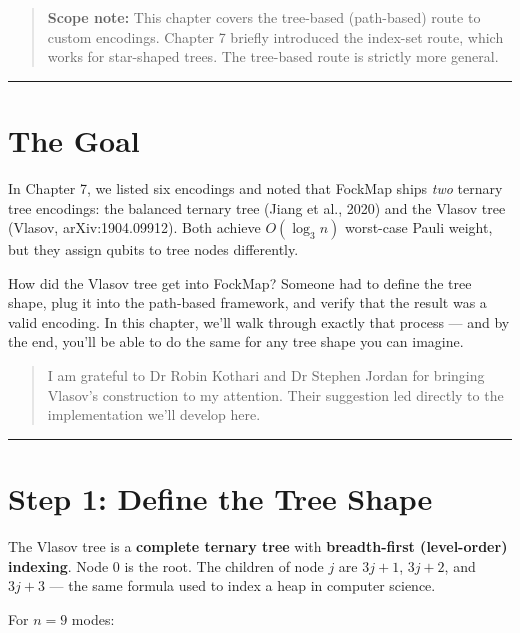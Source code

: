 \documentclass[
  11pt,
  oneside]{book}
\begin{document}
\begin{quote}
\textbf{Scope note:} This chapter covers the tree-based (path-based)
route to custom encodings. Chapter 7 briefly introduced the index-set
route, which works for star-shaped trees. The tree-based route is
strictly more general.
\end{quote}

\begin{center}\rule{0.5\linewidth}{0.5pt}\end{center}

\section{The Goal}\label{the-goal}

In Chapter 7, we listed six encodings and noted that FockMap ships
\emph{two} ternary tree encodings: the balanced ternary tree (Jiang et
al., 2020) and the Vlasov tree (Vlasov, arXiv:1904.09912). Both achieve
\(O(\log_3 n)\) worst-case Pauli weight, but they assign qubits to tree
nodes differently.

How did the Vlasov tree get into FockMap? Someone had to define the tree
shape, plug it into the path-based framework, and verify that the result
was a valid encoding. In this chapter, we'll walk through exactly that
process --- and by the end, you'll be able to do the same for any tree
shape you can imagine.

\begin{quote}
I am grateful to Dr Robin Kothari and Dr Stephen Jordan for bringing
Vlasov's construction to my attention. Their suggestion led directly to
the implementation we'll develop here.
\end{quote}

\begin{center}\rule{0.5\linewidth}{0.5pt}\end{center}

\section{Step 1: Define the Tree
Shape}\label{step-1-define-the-tree-shape}

The Vlasov tree is a \textbf{complete ternary tree} with
\textbf{breadth-first (level-order) indexing}. Node 0 is the root. The
children of node \(j\) are \(3j+1\), \(3j+2\), and \(3j+3\) --- the same
formula used to index a heap in computer science.

For \(n = 9\) modes:
\end{document}
